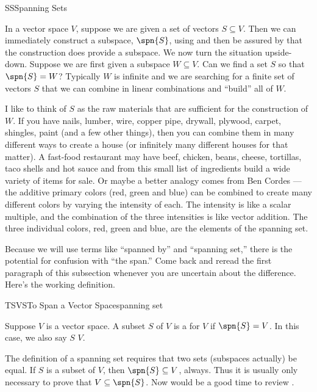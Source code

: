 \begin{subsect}{SS}{Spanning Sets}
%
\begin{para}In a vector space $V$, suppose we are given a set of vectors $S\subseteq V$.  Then we can immediately construct a subspace, $\spn{S}$, using  and then be assured by  that the construction does provide a subspace.  We now turn the situation upside-down.  Suppose we are first given a subspace $W\subseteq V$.  Can we find a set $S$ so that $\spn{S}=W$?  Typically $W$ is infinite and we are searching for a finite set of vectors $S$ that we can combine in linear combinations and ``build'' all of $W$.\end{para}
%
\begin{para}I like to think of $S$ as the raw materials that are sufficient for the construction of $W$.  If you have nails, lumber, wire, copper pipe, drywall, plywood, carpet, shingles, paint (and a few other things), then you can combine them in many different ways to create a house (or infinitely many different houses for that matter).  A fast-food restaurant may have beef, chicken, beans, cheese, tortillas, taco shells and hot sauce and from this small list of ingredients build a wide variety of items for sale.  Or maybe a better analogy comes from Ben Cordes --- the additive primary colors (red, green and blue) can be combined to create many different colors by varying the intensity of each.  The intensity is like a scalar multiple, and the combination of the three intensities is like vector addition.  The three individual colors, red, green and blue, are the elements of the spanning set.\end{para}
%
\begin{para}Because we will use terms like ``spanned by'' and ``spanning set,'' there is the potential for confusion with ``the span.''  Come back and reread the first paragraph of this subsection whenever you are uncertain about the difference.  Here's the working definition.\end{para}
%
%
\begin{definition}{TSVS}{To Span a Vector Space}{spanning set}
\begin{para}Suppose $V$ is a vector space.  A subset $S$ of $V$ is a  for $V$ if $\spn{S}=V$.  In this case, we also say $S$  $V$.\end{para}
\end{definition}
%
\begin{para}The definition of a spanning set requires that two sets (subspaces actually) be equal.  If $S$ is a subset of $V$, then $\spn{S}\subseteq V$, always.  Thus it is usually only necessary to prove that $V\subseteq\spn{S}$.  Now would be a good time to review .\end{para}

\end{subsect}
